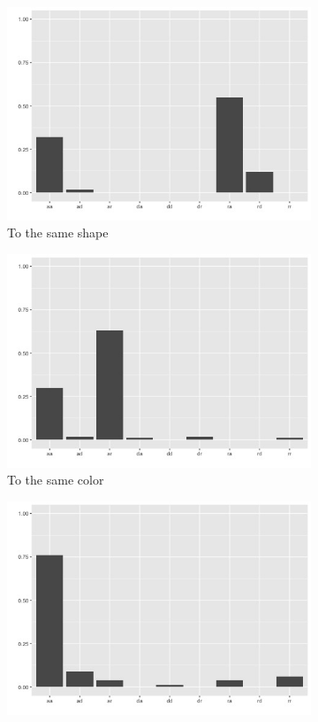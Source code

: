 \documentclass{article}
\begin{document}
\newpage
\begin{figure}
  \centering
  \begin{subfigure}[t]{0.25\textwidth}
    \centering
    \includegraphics[width=\linewidth]{agg_g1} 
    \caption{To the same shape} \label{fig:agg_g1}
  \end{subfigure}
  \begin{subfigure}[t]{0.25\textwidth}
    \centering
    \includegraphics[width=\linewidth]{agg_g3} 
    \caption{To the same color} \label{fig:agg_g3}
  \end{subfigure}
  \begin{subfigure}[t]{0.25\textwidth}
    \centering
    \includegraphics[width=\linewidth]{agg_g6} 

\end{subfigure}
\end{figure}
\end{document}
